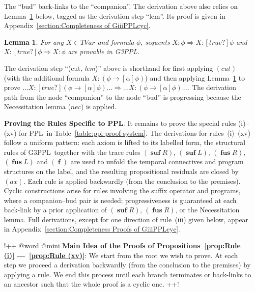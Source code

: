 \documentclass[manuscript,screen]{acmart}
\newtheorem{lemma}{Lemma}[section]
\newcommand{\true}[0]{\mathit{true}}
\newcommand{\GiiiPPLcyc}[0]{\mbox{G3PPL}}
\DeclareMathOperator{\ofst}{\mathbf{f}}
\DeclareMathOperator{\osuf}{\mathbf{suf}}
\DeclareMathOperator{\ofus}{\mathbf{fus}}
\newcommand{\TVar}[0]{\textit{TVar}}
\newcommand{\Nec}[0]{\textit{nec}}
\newcommand{\PPL}[0]{\mbox{PPL}}
\begin{document}
The ``bud'' back-links to the ``companion''. 
The derivation above also relies on Lemma~\ref{lemma:lemma for proving rule (inv)} below, tagged as the derivation step ``lem''. Its proof is given in Appendix~\ref{section:Completeness of GiiiPPLcyc}. 
\begin{lemma}
\label{lemma:lemma for proving rule (inv)}
For any $X\in \TVar$ and formula $\phi$, sequents $X: \phi\Rightarrow X : [\true?]\phi$ and $X : [\true?]\phi\Rightarrow X : \phi$ are provable in \GiiiPPLcyc. 
\end{lemma}
The derivation step ``(cut, \textit{lem})'' above is shorthand for first applying $(cut)$ (with the additional formula $X : (\phi\to [\alpha]\phi)$) and then applying Lemma~\ref{lemma:lemma for proving rule (inv)} to prove $\ldots X : [\true?](\phi\to[\alpha]\phi)\ldots\Rightarrow \ldots X:(\phi\to[\alpha]\phi)\ldots$. 
The derivation path from the node ``companion'' to the node ``bud'' is progressing because the Necessitation lemma ($\Nec$) is applied. 

\textbf{Proving the Rules Specific to \PPL}. 
It remains to prove the special rules (i)--(xv) for \PPL\ in Table~\ref{table:ppl-proof-system}. 
The derivations for rules~(i)--(xv) follow a uniform pattern: each axiom is lifted to its labelled form, the structural rules of \GiiiPPLcyc\ together with the trace rules $(\osuf R)$, $(\osuf L)$, $(\ofus R)$, $(\ofus L)$ and $(\ofst)$ are used to unfold the temporal connectives and program structures on the label, and the resulting propositional residuals are closed by $(ax)$.  
Each rule is applied backwardly (from the conclusion to the premises). 
Cyclic constructions arise for rules involving the suffix operator and programs, where a companion--bud pair is needed; progressiveness is guaranteed at each back-link by a prior application of $(\osuf R)$, $(\ofus R)$, or the Necessitation lemma. Full derivations, except for one direction of rule~(iii) given below, appear in Appendix~\ref{section:Completeness Proofs of GiiiPPLcyc}. 

\ifx
!++ @word @mini
\textbf{Main Idea of the Proofs of Propositions~\ref{prop:Rule (i)} ---~\ref{prop:Rule (xv)}}:
We start from the root we wish to prove. At each step we proceed a derivation backwardly (from the conclusion to the premises) by applying a rule. We end this process until each branch terminates or back-links to an ancestor such that the whole proof is a cyclic one. 
++!
\fi
\end{document}
